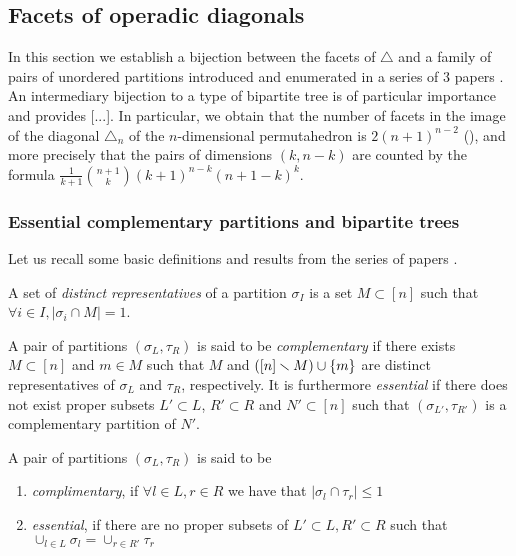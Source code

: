 
\subsection{Facets of operadic diagonals}

In this section we establish a bijection between the facets of $\triangle$ and a family of pairs of unordered partitions introduced and enumerated in a series of 3 papers \cite{chen1969computer,chen1971tables,kajitani1982number}. An intermediary bijection to a type of bipartite tree is of particular importance and provides [...].
In particular, we obtain that the number of facets in the image of the diagonal $\triangle_n$ of the $n$-dimensional permutahedron is $2(n+1)^{n-2}$ (), and more precisely that the pairs of dimensions $(k,n-k)$ are counted by the formula $\frac{1}{k+1}\binom{n+1}{k}(k+1)^{n-k}(n+1-k)^{k}$. 


\subsubsection{Essential complementary partitions and bipartite trees}
Let us recall some basic definitions and results from the series of papers \cite{chen1969computer,chen1971tables,kajitani1982number}.

\begin{definition}
A set of \emph{distinct representatives} of a partition $\sigma_I$ is a set $M\subset [n]$ such that $\forall i \in I,|\sigma_i \cap M| = 1$.
\end{definition}

\begin{definition}
A pair of partitions $(\sigma_L,\tau_R)$ is said to be \emph{complementary} if there exists $M\subset [n]$ and $m \in M$ such that $M$ and $([n]\smallsetminus M) \cup \{m\}$ are distinct representatives of $\sigma_L$ and $\tau_R$, respectively.
It is furthermore \emph{essential} if there does not exist proper subsets $ L'\subset L$, $R'\subset R$ and $N' \subset [n]$ such that $(\sigma_{L'},\tau_{R'})$ is a complementary partition of $N'$.
\end{definition}
\begin{definition}
A pair of partitions $(\sigma_L,\tau_R)$ is said to be 
\begin{enumerate}
	\item \emph{complimentary}, if $\forall l\in L, r\in R$ we have that $|\sigma_l \cap \tau_r| \leq 1$
	\item \emph{essential}, if there are no proper subsets of $L'\subset L,R'\subset R$ such that $\cup_{l \in L} \sigma_l = \cup_{r \in R'} \tau_r$
\end{enumerate}	

\end{definition}

